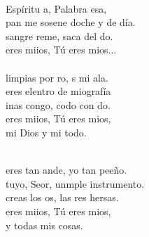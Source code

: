 \documentclass[12pt]{article}
\begin{document}
\begin{multicols*}{2}
\begin{cancion}%
	       \\
	Espíritu a, Palabra esa, \\
	pan me sosene doche y de día.\\
	sangre reme, saca del do.\\
	 eres miios, Tú eres mios...\\
\jump
	      \\
	limpias por ro, s mi ala. \\
	 eres elentro de miografía\\
	inas congo,  codo con do.\\
	 eres miios, Tú eres mios,\\
mi Dios y mi todo.\\\jump\\
	\begin{chorus}%
	 eres tan ande, yo  tan peeño. \\
	 tuyo, Seor, unmple instrumento.\\
	 creas los os, las res hersas.  \\
	 eres miios, Tú eres mios,\\
y todas mis cosas.\\
	\end{chorus}%
	\jump\\
	      \\

\end{cancion}
\end{multicols*}
\end{document}
